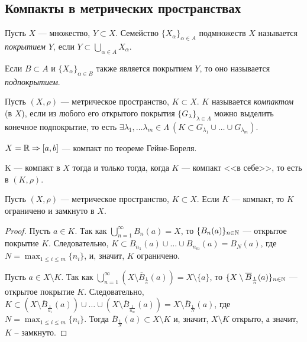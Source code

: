 \subsection{Компакты в метрических пространствах}

\begin{definition}
    Пусть $X$ --- множество, $Y \subset X$. Семейство $\{X_\alpha\}_{\alpha \in A}$ подмножеств $X$ называется \emph{покрытием $Y$}, если $Y \subset \bigcup_{\alpha \in A} X_\alpha$.

    Если $B \subset A$ и $\{X_\alpha\}_{\alpha \in B}$ также является покрытием $Y$, то оно называется \emph{подпокрытием}.
\end{definition}

\begin{definition}
    Пусть $(X, \rho)$ --- метрическое пространство, $K \subset X$. $K$ называется \emph{компактом} (в $X$), если из любого его открытого покрытия $\{G_\lambda\}_{\lambda \in \Lambda}$ можно выделить конечное подпокрытие, то есть $\exists \lambda_1, \ldots \lambda_m \in \Lambda \ (K \subset G_{\lambda_1} \cup \ldots \cup G_{\lambda_m})$.
\end{definition}

\begin{example}
    $X = \mathbb{R} \Rightarrow [a, b]$ --- компакт по теореме Гейне-Бореля.
\end{example}

\begin{note}
    K --- компакт в $X$ тогда и только тогда, когда $K$ --- компакт <<в себе>>, то есть в $(K, \rho)$.
\end{note}

\begin{lemma}
    \label{lem_lim_closed}
    Пусть $(X, \rho)$ --- метрическое пространство, $K \subset X$. Если $K$ --- компакт, то $K$ ограничено и замкнуто в $X$.

    \begin{proof}
        Пусть $a \in K$. Так как $\bigcup_{n = 1}^\infty B_n(a) = X$, то $\{B_n(a)\}_{n \in \mathbb{N}}$ --- открытое покрытие $K$. Следовательно, $K \subset B_{n_1}(a) \cup \ldots \cup B_{n_m}(a) = B_N(a)$, где $N = \max_{1 \le i \le m}\{n_i\}$, и, значит, $K$ ограничено.

        Пусть $a \in X \setminus K$. Так как $\bigcup_{n=1}^{\infty}\left(X \setminus \overline{B}_{\frac{1}{n}}(a)\right) = X \setminus \{a\}$, то $\{X \setminus \overline{B}_{\frac{1}{n}} (a)\}_{n \in \mathbb{N}}$ --- открытое покрытие $K$. Следовательно, $K \subset \left(X \setminus \overline{B}_{\frac{1}{n_1}}(a)\right) \cup \ldots \cup \left(X \setminus \overline{B}_{\frac{1}{n_m}}(a)\right) = X \setminus \overline{B}_{\frac{1}{N}}(a)$, где $N = \max_{1 \le i \le m}\{n_i\}$. Тогда $\overline{B}_{\frac{1}{N}}(a) \subset X \setminus K$ и, значит, $X \setminus K$ открыто, а значит, $K$ -- замкнуто.
    \end{proof}
\end{lemma}

